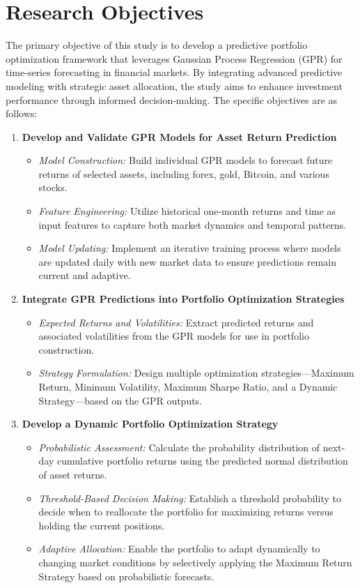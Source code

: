 \section{Research Objectives}
The primary objective of this study is to develop a predictive portfolio optimization framework that leverages Gaussian Process Regression (GPR) for time-series forecasting in financial markets. 
By integrating advanced predictive modeling with strategic asset allocation, the study aims to enhance investment performance through informed decision-making. 
The specific objectives are as follows:

\begin{enumerate}
    \item \textbf{Develop and Validate \ac{GPR} Models for Asset Return Prediction}
    \begin{itemize}
        \item \emph{Model Construction:} Build individual GPR models to forecast future returns of selected assets, including forex, gold, Bitcoin, and various stocks.
        \item \emph{Feature Engineering:} Utilize historical one-month returns and time as input features to capture both market dynamics and temporal patterns.
        \item \emph{Model Updating:} Implement an iterative training process where models are updated daily with new market data to ensure predictions remain current and adaptive.
    \end{itemize}
    
    \item \textbf{Integrate \ac{GPR} Predictions into Portfolio Optimization Strategies}
    \begin{itemize}
        \item \emph{Expected Returns and Volatilities:} Extract predicted returns and associated volatilities from the GPR models for use in portfolio construction.
        \item \emph{Strategy Formulation:} Design multiple optimization strategies---Maximum Return, Minimum Volatility, Maximum Sharpe Ratio, and a Dynamic Strategy---based on the \ac{GPR} outputs.
    \end{itemize}
    
    \item \textbf{Develop a Dynamic Portfolio Optimization Strategy}
    \begin{itemize}
        \item \emph{Probabilistic Assessment:} Calculate the probability distribution of next-day cumulative portfolio returns using the predicted normal distribution of asset returns.
        \item \emph{Threshold-Based Decision Making:} Establish a threshold probability to decide when to reallocate the portfolio for maximizing returns versus holding the current positions.
        \item \emph{Adaptive Allocation:} Enable the portfolio to adapt dynamically to changing market conditions by selectively applying the Maximum Return Strategy based on probabilistic forecasts.
    \end{itemize}
    

\end{enumerate}
